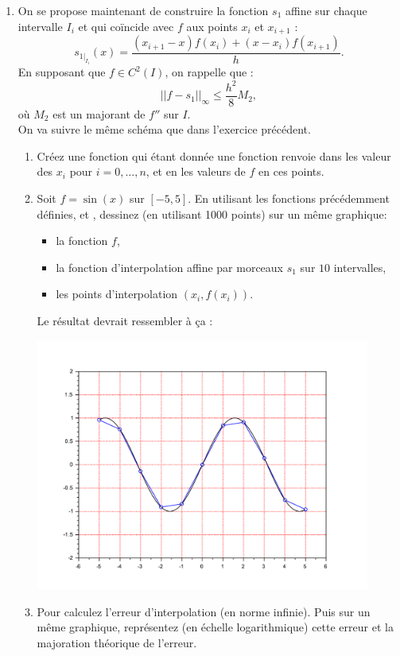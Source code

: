 \documentclass[a4paper,12pt,reqno]{amsart}
\begin{document}
\begin{exo}
\begin{enumerate}
    \item On se propose maintenant de construire la fonction $s_1$ affine sur chaque intervalle $I_i$ et qui coïncide avec $f$ aux points $x_i$ et $x_{i+1}$ :
      $$
        s_{1|_{I_i}}(x)= \frac{(x_{i+1}-x)f(x_i)+(x-x_i)f(x_{i+1})}{h}.
      $$
      En supposant que $f \in C^2(I)$, on rappelle que  :
      $$
        ||f-s_1||_{\infty}\leq \frac{h^2}{8} M_2,
      $$
      où $M_2$ est un majorant de $f''$ sur $I$.\\
      On va suivre le même schéma que dans l'exercice précédent.
      \begin{enumerate}
      \item Créez une fonction  qui étant donnée une fonction  renvoie dans  les valeur des $x_{i}$ pour $i=0,\ldots,n$, et en  les valeurs de $f$ en ces points.

      \item Soit $f=\sin(x)$ sur $[-5,5]$. En utilisant les fonctions précédemment définies,  et , dessinez (en utilisant 1000 points) sur un même graphique:
      \begin{itemize}
        \item la fonction $f$,
        \item la fonction d'interpolation affine par morceaux $s_{1}$ sur $10$ intervalles,
        \item les points d'interpolation $(x_{i},f(x_{i}))$.
      \end{itemize}
      Le résultat devrait ressembler à ça :
      \begin{center}
        \includegraphics[width=11cm]{SciLab_test_interp_affine}
      \end{center}

      \item Pour  calculez l'erreur d'interpolation (en norme infinie). Puis sur un même graphique, représentez (en échelle logarithmique) cette erreur et la majoration théorique de l'erreur.
    \end{enumerate}
  \end{enumerate}
\end{exo}
\end{document}
